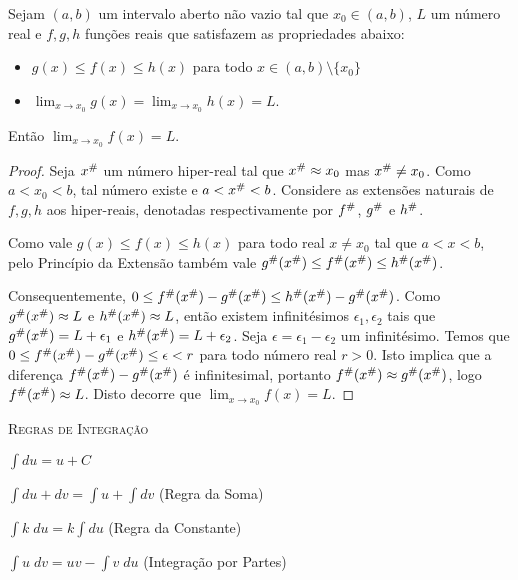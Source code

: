 \documentclass{svmono}
\begin{document}
\begin{theorem}
Sejam $(a,b)$ um intervalo aberto não vazio tal que $x_0 \in (a,b)$, $L$ um
número real e $f,g,h$ funções reais que satisfazem as propriedades
abaixo:
\begin{itemize}
\item $g(x) \le f(x) \le h(x)$ para todo $x \in (a,b) \setminus \{ x_0 \}$
\item $\lim_{x \rightarrow x_0} g(x) = \lim_{x \rightarrow x_0} h(x) = L.$
\end{itemize}
Então $\lim_{x \rightarrow x_0} f(x) = L$.
\end{theorem}

\begin{proof}
Seja ${x}^\#$ um número hiper-real tal que ${x}^\# \approx x_0$ mas
${x}^\# \ne x_0$. Como $a < x_0 < b$, tal número existe e
$a < {x}^\# < b$. Considere as
extensões naturais de $f,g,h$ aos hiper-reais, denotadas respectivamente
por ${f}^\#$, ${g}^\#$ e ${h}^\#$.

Como vale $g(x) \le f(x) \le h(x)$ para todo real $x \ne x_0$ tal que
$a < x < b$, pelo Princípio da Extensão também vale
${g}^\#({x}^\#) \le {f}^\#({x}^\#) \le {h}^\#({x}^\#)$.

Consequentemente, 
$0 \le {f}^\#({x}^\#) - {g}^\#({x}^\#) \le {h}^\#({x}^\#) - {g}^\#({x}^\#)$. Como ${g}^\#({x}^\#) \approx L$ e ${h}^\#({x}^\#) \approx L$, então existem infinitésimos $\epsilon_1, \epsilon_2$ tais que
${g}^\#({x}^\#) = L + \epsilon_1$ e ${h}^\#({x}^\#) = L + \epsilon_2$. Seja $\epsilon = \epsilon_1 - \epsilon_2$ um infinitésimo. Temos que $0 \le {f}^\#({x}^\#) - {g}^\#({x}^\#) \le \epsilon < r$ para todo número real $r > 0$. Isto implica que a diferença ${f}^\#({x}^\#) - {g}^\#({x}^\#)$ é
infinitesimal, portanto ${f}^\#({x}^\#) \approx {g}^\#({x}^\#)$, logo ${f}^\#({x}^\#) \approx L$. Disto decorre que $\lim_{x \rightarrow x_0} f(x) = L$.
\end{proof}

\backmatter

\printindex

\pagestyle{empty}

\setlength{\parindent}{0pt}
\setlength{\parskip}{2pt}

\textsc{Regras de Integração}

{\small
\begin{multicols}{2}
$\displaystyle \int du = u + C$

$\displaystyle \int du + dv = \int u +\int dv$ (Regra da Soma)

$\displaystyle \int k \; du = k \int du$ (Regra da Constante)

$\displaystyle \int u \; dv = uv - \int v \; du$ (Integração por Partes)
\end{multicols}
}
\end{document}
